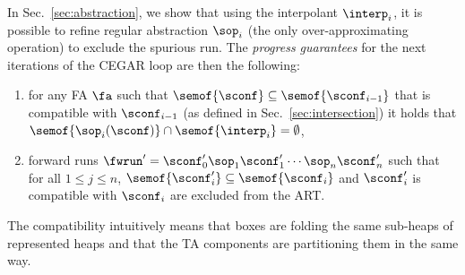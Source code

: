 {In Sec.~\ref{sec:abstraction}, we show that
using the interpolant $\interp_{i}$, 
it is possible to refine regular abstraction $\sop_i$ (the only over-approximating operation)
to exclude the spurious run.
The \emph{progress guarantees} for the next iterations of the CEGAR loop are then the 
following:
%
\begin{enumerate}
\item
for any FA $\fa$ such that  
$\semof{\sconf}\subseteq\semof{\sconf_{i-1}}$ 
that is compatible with $\sconf_{i-1}$ (as defined in Sec.~\ref{sec:intersection})
it holds that
$\semof{\sop_i(\sconf)} \cap \semof{\interp_i} = \emptyset$,
%
\item
forward runs $\fwrun' = \sconf_0'\sop_1\sconf_1'\cdots\sop_n\sconf_n'$ such
that for all $1\leq j \leq n$, $\semof{\sconf_i'}\subseteq\semof{\sconf_i}$
and $\sconf_i'$ is compatible with $\sconf_i$ are excluded from the
ART.
\end{enumerate}
%
The compatibility intuitively means that boxes are folding the same sub-heaps of represented heaps and that the TA components are partitioning them in the same way.
%

%
%
%
%
%



}
